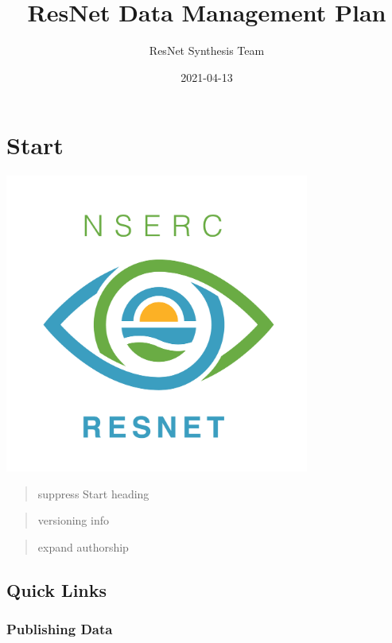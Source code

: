 \documentclass[
]{book}
\title{ResNet Data Management Plan}
\author{ResNet Synthesis Team}
\date{2021-04-13}
\begin{document}
\maketitle

{
\setcounter{tocdepth}{1}
\tableofcontents
}
\hypertarget{start}{%
\chapter*{Start}\label{start}}

\includegraphics[width=0.75\textwidth,height=\textheight]{static/ResNet-logo.png}

\begin{quote}
suppress Start heading
\end{quote}

\begin{quote}
versioning info
\end{quote}

\begin{quote}
expand authorship
\end{quote}

\hypertarget{quick-links}{%
\section*{Quick Links}\label{quick-links}}

\hypertarget{publishing-data}{%
\subsection*{Publishing Data}\label{publishing-data}}
\end{document}
